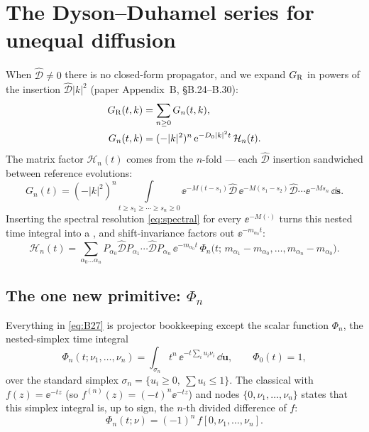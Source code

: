 \section{The Dyson--Duhamel series for unequal diffusion}\label{sec:dyson}

When $\widehat{\mathcal{D}}\ne0$ there is no closed-form propagator, and we
expand $G_{\mathrm R}$ in powers of the insertion $\widehat{\mathcal{D}}|k|^{2}$ (paper
Appendix~B, \S B.24--B.30):
\begin{align}
  G_{\mathrm R}(t,k)&=\sum_{n\ge0}G_{n}(t,k),\notag\\
  G_{n}(t,k)&=(-|k|^{2})^{n}\,\mathrm{e}^{-D_{0}|k|^{2}t}\,\mathcal{H}_{n}(t).
  \label{eq:B26}
\end{align}
The matrix factor $\mathcal{H}_{n}(t)$ comes from the $n$-fold  --- each $\widehat{\mathcal{D}}$ insertion sandwiched between
reference evolutions:
\begin{equation}
  G_{n}(t)=(-|k|^{2})^{n}\!\!\int\limits_{t\ge s_{1}\ge\cdots\ge s_{n}\ge0}
   \!\!\ee^{-M(t-s_{1})}\widehat{\mathcal{D}}\,
   \ee^{-M(s_{1}-s_{2})}\widehat{\mathcal{D}}\cdots
   \ee^{-Ms_{n}}\,\dd\mathbf{s}.
  \label{eq:duhamel}
\end{equation}
Inserting the spectral resolution \eqref{eq:spectral} for every $\ee^{-M(\cdot)}$
turns this nested time integral into a , and
shift-invariance factors out $\ee^{-m_{\alpha_{0}}t}$:
\begin{equation}
  \mathcal{H}_{n}(t)=\!\!\sum_{\alpha_{0}\dots\alpha_{n}}\!\!
   P_{\alpha_{0}}\widehat{\mathcal{D}}P_{\alpha_{1}}\cdots
   \widehat{\mathcal{D}}P_{\alpha_{n}}\,
   \ee^{-m_{\alpha_{0}}t}\,
   \Phi_{n}\!\big(t;\,m_{\alpha_{1}}-m_{\alpha_{0}},\dots,
   m_{\alpha_{n}}-m_{\alpha_{0}}\big).
  \label{eq:B27}
\end{equation}

\subsection{The one new primitive: \texorpdfstring{$\Phi_{n}$}{Phi\_n}}

Everything in \eqref{eq:B27} is projector bookkeeping except the scalar function
$\Phi_{n}$, the nested-simplex time integral
\begin{equation}
  \Phi_{n}(t;\nu_{1},\dots,\nu_{n})=\int_{\sigma_{n}}
    t^{n}\,\ee^{-t\sum_{i}u_{i}\nu_{i}}\,\dd\mathbf{u},
  \qquad \Phi_{0}(t)=1,
  \label{eq:phin}
\end{equation}
over the standard simplex $\sigma_{n}=\{u_{i}\ge0,\ \sum u_{i}\le1\}$. The
classical  with $f(z)=\ee^{-tz}$ (so
$f^{(n)}(z)=(-t)^{n}\ee^{-tz}$) and nodes $\{0,\nu_{1},\dots,\nu_{n}\}$ states
that this simplex integral is, up to sign, the $n$-th divided difference of $f$:
\begin{equation}
  \Phi_{n}(t;\nu)=(-1)^{n}\,f[0,\nu_{1},\dots,\nu_{n}].
  \label{eq:hg}
\end{equation}

